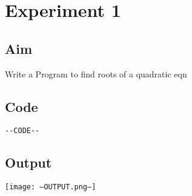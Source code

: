 \documentclass{article}
\begin{document}
\section*{Experiment 1 }
\vspace{20px}
\subsection*{Aim}
Write a Program to find roots of a quadratic eqn

\subsection*{Code}

\begin{verbatim}
--CODE--
\end{verbatim}

\newpage

\subsection{Output}
\texttt{[image: --OUTPUT.png--]}

\newpage
\end{document}
